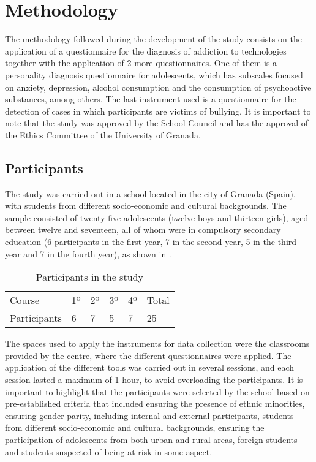 \documentclass[english]{textolivre}
\begin{document}
\section{Methodology}\label{sec-meth}
The methodology followed during the development of the study consists on the application of a questionnaire for the diagnosis of addiction to technologies together with the application of 2 more questionnaires. One of them is a personality diagnosis questionnaire for adolescents, which has subscales focused on anxiety, depression, alcohol consumption and the consumption of psychoactive substances, among others. The last instrument used is a questionnaire for the detection of cases in which participants are victims of bullying. It is important to note that the study was approved by the School Council and has the approval of the Ethics Committee of the University of Granada.

\subsection{Participants}
The study was carried out in a school located in the city of Granada (Spain), with students from different socio-economic and cultural backgrounds. The sample consisted of twenty-five adolescents (twelve boys and thirteen girls), aged between twelve and seventeen, all of whom were in compulsory secondary education (6 participants in the first year, 7 in the second year, 5 in the third year and 7 in the fourth year), as shown in .

\begin{table}[htpb]
\centering
\begin{threeparttable}
\caption{Participants in the study}\label{tbl01}
\begin{tabular}{@{}llllll@{}}
\toprule
Course & 1º & 2º & 3º & 4º & Total \\
Participants & 6 & 7 & 5 & 7 & 25 \\
\bottomrule
\end{tabular}
\end{threeparttable}
\end{table}

The spaces used to apply the instruments for data collection were the classrooms provided by the centre, where the different questionnaires were applied. The application of the different tools was carried out in several sessions, and each session lasted a maximum of 1 hour, to avoid overloading the participants. It is important to highlight that the participants were selected by the school based on pre-established criteria that included ensuring the presence of ethnic minorities, ensuring gender parity, including internal and external participants, students from different socio-economic and cultural backgrounds, ensuring the participation of adolescents from both urban and rural areas, foreign students and students suspected of being at risk in some aspect.
\end{document}
